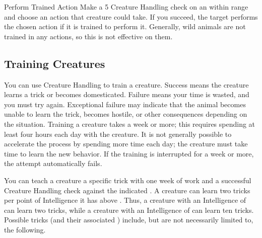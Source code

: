         \begin{freeability}{Perform Trained Action}
            Make a  5 Creature Handling check on an  within \rnglong range and choose an action that creature could take.
            If you succeed, the target performs the chosen action if it is trained to perform it.
            Generally, wild animals are not trained in any actions, so this is not effective on them.
        \end{freeability}

    \subsection{Training Creatures}\label{Training Creatures}
        You can use Creature Handling to train a creature. Success means the creature learns a trick or becomes domesticated. Failure means your time is wasted, and you must try again. Exceptional failure may indicate that the animal becomes unable to learn the trick, becomes hostile, or other consequences depending on the situation. Training a creature takes a week or more; this requires spending at least four hours each day with the creature. It is not generally possible to accelerate the process by spending more time each day; the creature must take time to learn the new behavior. If the training is interrupted for a week or more, the attempt automatically fails.

         You can teach a creature a specific trick with one week of work and a successful Creature Handling check against the indicated . A creature can learn two tricks per point of Intelligence it has above . Thus, a creature with an Intelligence of  can learn two tricks, while a creature with an Intelligence of  can learn ten tricks. Possible tricks (and their associated ) include, but are not necessarily limited to, the following.

